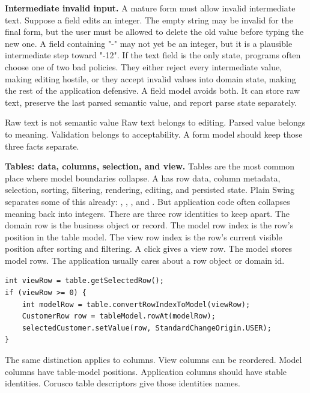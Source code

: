 \textbf{Intermediate invalid input.} A mature form must allow invalid intermediate text. Suppose a field edits an integer. The empty string may be invalid for the final form, but the user must be allowed to delete the old value before typing the new one. A field containing "-" may not yet be an integer, but it is a plausible intermediate step toward "-12". If the text field is the only state, programs often choose one of two bad policies. They either reject every intermediate value, making editing hostile, or they accept invalid values into domain state, making the rest of the application defensive. A field model avoids both. It can store raw text, preserve the last parsed semantic value, and report parse state separately.

\begin{principlebox}{Raw text is not semantic value}
Raw text belongs to editing. Parsed value belongs to meaning. Validation belongs to acceptability. A form model should keep those three facts separate.
\end{principlebox}

\textbf{Tables: data, columns, selection, and view.} Tables are the most common place where model boundaries collapse. A  has row data, column metadata, selection, sorting, filtering, rendering, editing, and persisted state. Plain Swing separates some of this already: , , , and . But application code often collapses meaning back into integers. There are three row identities to keep apart. The domain row is the business object or record. The model row index is the row's position in the table model. The view row index is the row's current visible position after sorting and filtering. A click gives a view row. The model stores model rows. The application usually cares about a row object or domain id.

\begin{lstlisting}[caption={Do not treat view rows as model rows.}]
int viewRow = table.getSelectedRow();
if (viewRow >= 0) {
    int modelRow = table.convertRowIndexToModel(viewRow);
    CustomerRow row = tableModel.rowAt(modelRow);
    selectedCustomer.setValue(row, StandardChangeOrigin.USER);
}
\end{lstlisting}

The same distinction applies to columns. View columns can be reordered. Model columns have table-model positions. Application columns should have stable identities. Corusco table descriptors give those identities names.

